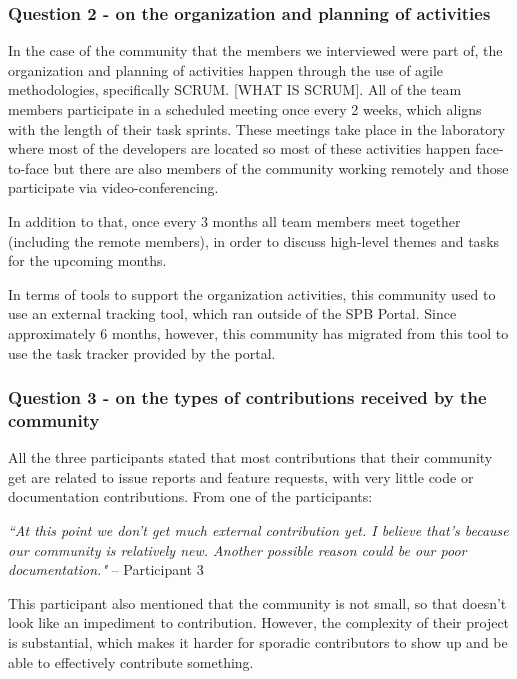 \documentclass{sigchi}
\begin{document}
\subsubsection{Question 2 - on the organization and planning of activities}
In the case of the community that the members we interviewed were part of, the organization and planning of activities happen through the use of agile methodologies, specifically SCRUM. [WHAT IS SCRUM]. All of the team members participate in a scheduled meeting once every 2 weeks, which aligns with the length of their task sprints. These meetings take place in the laboratory where most of the developers are located so most of these activities happen face-to-face but there are also members of the community working remotely and those participate via video-conferencing.

In addition to that, once every 3 months all team members meet together (including the remote members), in order to discuss high-level themes and tasks for the upcoming months.

In terms of tools to support the organization activities, this community used to use an external tracking tool, which ran outside of the SPB Portal. Since approximately 6 months, however, this community has migrated from this tool to use the task tracker provided by the portal.

\subsubsection{Question 3 - on the types of contributions received by the community}

All the three participants stated that most contributions that their community get are related to issue reports and feature requests, with very little code or documentation contributions. From one of the participants:

\begin{displayquote}
\textit{``At this point we don't get much external contribution yet. I believe that's because our community is relatively new. Another possible reason could be our poor documentation."} – Participant 3
\end{displayquote}

This participant also mentioned that the community is not small, so that doesn't look like an impediment to contribution. However, the complexity of their project is substantial, which makes it harder for sporadic contributors to show up and be able to effectively contribute something.
\end{document}
